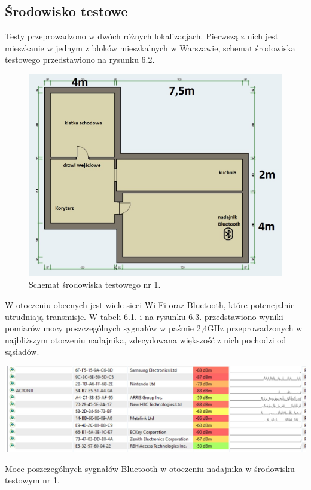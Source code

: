\documentclass[12pt, twoside, openany]{mwrep}
\begin{document}
\subsection{Środowisko testowe}
Testy przeprowadzono w dwóch różnych lokalizacjach. Pierwszą z nich jest mieszkanie w jednym z bloków mieszkalnych w Warszawie, schemat środowiska testowego przedstawiono na rysunku 6.2.
\begin{figure}[H]
\centering
\includegraphics[scale=0.6]{mieszkanke}
\caption{Schemat środowiska testowego nr 1.}
\end{figure}
W otoczeniu obecnych jest wiele sieci Wi-Fi oraz Bluetooth, które potencjalnie utrudniają transmisje. W tabeli 6.1. i na rysunku 6.3. przedstawiono wyniki pomiarów mocy poszczególnych sygnałów w paśmie 2,4GHz przeprowadzonych w najbliższym otoczeniu nadajnika, zdecydowana większość z nich pochodzi od sąsiadów.
\begin{table}[H]
\centering
\includegraphics[scale=0.4]{bt}
\caption{Moce poszczególnych sygnałów Bluetooth w otoczeniu nadajnika w środowisku testowym nr 1.}
\end{table}
\end{document}
